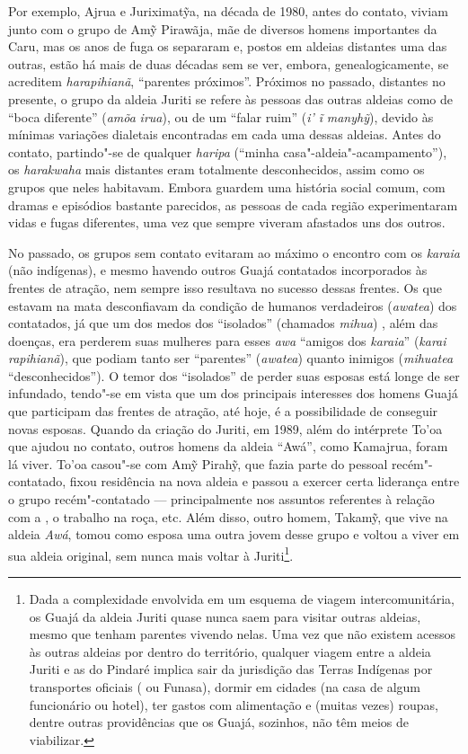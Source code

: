 Por exemplo, Ajrua e Juriximatỹa, na década de 1980, antes do contato,
viviam junto com o grupo de Amỹ Pirawãja, mãe de diversos homens
importantes da  Caru, mas os anos de fuga os separaram e, postos em
aldeias distantes uma das outras, estão há mais de duas décadas sem se
ver, embora, genealogicamente, se acreditem \emph{harapihianã},
``parentes próximos''. Próximos no passado, distantes no presente, o grupo
da aldeia Juriti se refere às pessoas das outras aldeias como de ``boca
diferente'' (\emph{amõa} \emph{irua}), ou de um ``falar ruim'' (\emph{i' ĩ}
\emph{manyhỹ}), devido às mínimas variações dialetais encontradas em
cada uma dessas aldeias. Antes do contato, partindo"-se de qualquer
\emph{haripa} (``minha casa"-aldeia"-acampamento''), os \emph{harakwaha}
mais distantes eram totalmente desconhecidos, assim como os grupos que
neles habitavam. Embora guardem uma história social comum, com dramas e
episódios bastante parecidos, as pessoas de cada região experimentaram
vidas e fugas diferentes, uma vez que sempre viveram afastados uns dos
outros.

No passado, os grupos sem contato evitaram ao máximo o encontro com os
\emph{karaia} (não indígenas), e mesmo havendo outros Guajá contatados
incorporados às frentes de atração, nem sempre isso resultava no sucesso
dessas frentes. Os que estavam na mata desconfiavam da condição de
humanos verdadeiros (\emph{awatea}) dos contatados, já que um dos medos
dos ``isolados'' (chamados \emph{mihua}) , além das doenças, era perderem
suas mulheres para esses \emph{awa} ``amigos dos \emph{karaia}''
(\emph{karai rapihianã}), que podiam tanto ser ``parentes''
(\emph{awatea}) quanto inimigos (\emph{mihuatea} ``desconhecidos''). O
temor dos ``isolados'' de perder suas esposas está longe de ser infundado,
tendo"-se em vista que um dos principais interesses dos homens Guajá que
participam das frentes de atração, até hoje, é a possibilidade de
conseguir novas esposas. Quando da criação do  Juriti, em 1989, além
do intérprete To'oa que ajudou no contato, outros homens da aldeia
``Awá'', como Kamajrua, foram lá viver. To'oa casou"-se com Amỹ Pirahỹ, que
fazia parte do pessoal recém"-contatado, fixou residência na nova aldeia
e passou a exercer certa liderança entre o grupo recém"-contatado ---
principalmente nos assuntos referentes à relação com a , o trabalho
na roça, etc. Além disso, outro homem, Takamỹ, que vive na aldeia
\emph{Awá}, tomou como esposa uma outra jovem desse grupo e voltou a
viver em sua aldeia original, sem nunca mais voltar à Juriti\footnote{Dada
  a complexidade envolvida em um esquema de viagem intercomunitária, os
  Guajá da aldeia Juriti quase nunca saem para visitar outras aldeias,
  mesmo que tenham parentes vivendo nelas. Uma vez que não existem
  acessos às outras aldeias por dentro do território, qualquer viagem
  entre a aldeia Juriti e as do Pindaré implica sair da jurisdição das
  Terras Indígenas por transportes oficiais ( ou Funasa), dormir em
  cidades (na casa de algum funcionário ou hotel), ter gastos com
  alimentação e (muitas vezes) roupas, dentre outras providências que os
  Guajá, sozinhos, não têm meios de viabilizar.}.


